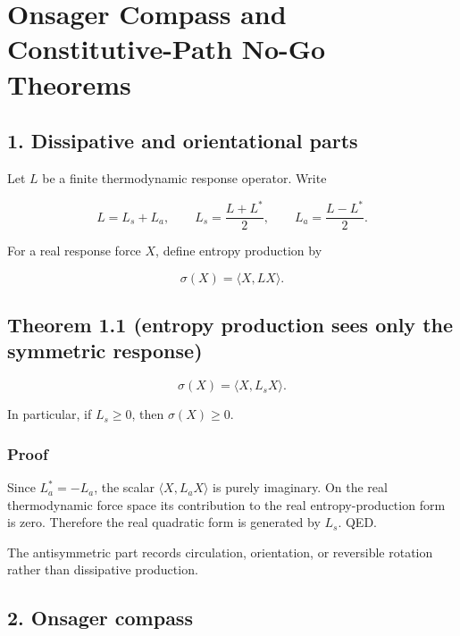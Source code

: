 \hypertarget{onsager-compass-and-constitutive-path-no-go-theorems}{%
\chapter{Onsager Compass and Constitutive-Path No-Go Theorems}\label{onsager-compass-and-constitutive-path-no-go-theorems}}

\hypertarget{dissipative-and-orientational-parts}{%
\section{1. Dissipative and orientational parts}\label{dissipative-and-orientational-parts}}

Let \(L\) be a finite thermodynamic response operator. Write

\[
L=L_s+L_a,
\qquad
L_s=\frac{L+L^*}{2},
\qquad
L_a=\frac{L-L^*}{2}.
\]

For a real response force \(X\), define entropy production by

\[
\sigma(X)=\langle X,LX\rangle.
\]

\hypertarget{theorem-1.1-entropy-production-sees-only-the-symmetric-response}{%
\section{Theorem 1.1 (entropy production sees only the symmetric response)}\label{theorem-1.1-entropy-production-sees-only-the-symmetric-response}}

\[
\boxed{
\sigma(X)=\langle X,L_sX\rangle.
}
\]

In particular, if \(L_s\ge0\), then \(\sigma(X)\ge0\).

\hypertarget{proof}{%
\subsection{Proof}\label{proof}}

Since \(L_a^*=-L_a\), the scalar \(\langle X,L_aX\rangle\) is purely imaginary. On the real thermodynamic force space its contribution to the real entropy-production form is zero. Therefore the real quadratic form is generated by \(L_s\). QED.

The antisymmetric part records circulation, orientation, or reversible rotation rather than dissipative production.

\hypertarget{onsager-compass}{%
\section{2. Onsager compass}\label{onsager-compass}}

